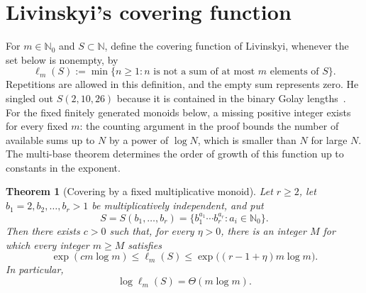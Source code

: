 \documentclass[11pt]{article}
\newtheorem{theorem}{Theorem}[section]
\newcommand{\N}{\mathbb{N}}
\begin{document}
\section{Livinskyi's covering function}\label{sec:covering}
For $m\in\N_0$ and $S\subset\N$, define the covering function of Livinskyi, whenever the set below is nonempty, by
\begin{equation}\label{eq:ell-def}
\ell_m(S):=\min\{n\ge1:n\text{ is not a sum of at most }m\text{ elements of }S\}.
\end{equation}
Repetitions are allowed in this definition, and the empty sum represents zero. He singled out $S(2,10,26)$ because it is contained in the binary Golay lengths~\cite{Livinskyi2012}. For the fixed finitely generated monoids below, a missing positive integer exists for every fixed $m$: the counting argument in the proof bounds the number of available sums up to $N$ by a power of $\log N$, which is smaller than $N$ for large $N$.  The multi-base theorem determines the order of growth of this function up to constants in the exponent.

\begin{theorem}[Covering by a fixed multiplicative monoid]\label{thm:ell-general}
Let $r\ge2$, let $b_1=2,b_2,\ldots,b_r>1$ be multiplicatively independent, and put
\[
S=S(b_1,\ldots,b_r)=\{b_1^{a_1}\cdots b_r^{a_r}:a_i\in\N_0\}.
\]
Then there exists $c>0$ such that, for every $\eta>0$, there is an integer $M$ for which every integer $m\ge M$ satisfies
\begin{equation}\label{eq:ell-bounds}
\exp(c m\log m)
\le \ell_m(S)
\le \exp\bigl((r-1+\eta)m\log m\bigr).
\end{equation}
In particular,
\[
\log\ell_m(S)=\Theta(m\log m).
\]
\end{theorem}
\end{document}

